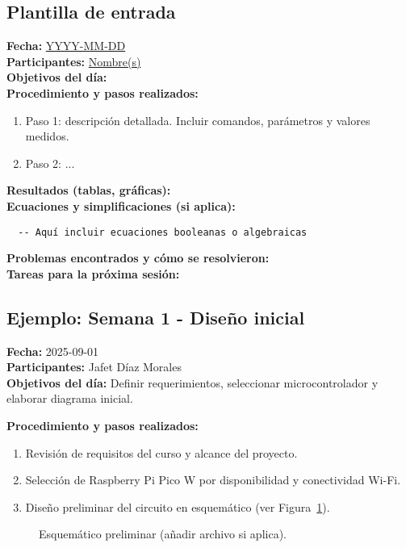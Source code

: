 \documentclass[12pt,a4paper]{article}
\begin{document}
\subsection*{Plantilla de entrada}
\noindent\textbf{Fecha:} \underline{YYYY-MM-DD}\\
\textbf{Participantes:} \underline{Nombre(s)}\\
\textbf{Objetivos del día:} \\ 
\textbf{Procedimiento y pasos realizados:} \\ 
\begin{enumerate}
  \item Paso 1: descripción detallada. Incluir comandos, parámetros y valores medidos.
  \item Paso 2: ...
\end{enumerate}
\textbf{Resultados (tablas, gráficas):} \\ 
\textbf{Ecuaciones y simplificaciones (si aplica):} 
\begin{verbatim}
  -- Aquí incluir ecuaciones booleanas o algebraicas
\end{verbatim}
\textbf{Problemas encontrados y cómo se resolvieron:} \\ 
\textbf{Tareas para la próxima sesión:} \\ 
\vspace{0.5cm}

\subsection*{Ejemplo: Semana 1 - Diseño inicial}
\textbf{Fecha:} 2025-09-01\\
\textbf{Participantes:} Jafet Díaz Morales\\
\textbf{Objetivos del día:} Definir requerimientos, seleccionar microcontrolador y elaborar diagrama inicial.

\textbf{Procedimiento y pasos realizados:}
\begin{enumerate}
  \item Revisión de requisitos del curso y alcance del proyecto.
  \item Selección de Raspberry Pi Pico W por disponibilidad y conectividad Wi-Fi.
  \item Diseño preliminar del circuito en esquemático (ver Figura~\ref{fig:esquematico}).
\end{enumerate}

\begin{figure}[h]
  \centering
  \caption{Esquemático preliminar (añadir archivo si aplica).}
  \label{fig:esquematico}
\end{figure}
\end{document}
